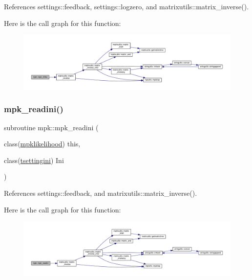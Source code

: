 References settings\+::feedback, settings\+::logzero, and matrixutils\+::matrix\+\_\+inverse().

Here is the call graph for this function\+:
\nopagebreak
\begin{figure}[H]
\begin{center}
\leavevmode
\includegraphics[width=350pt]{namespacempk_a881489521c6dfae2df332a70f188e9db_cgraph}
\end{center}
\end{figure}
\mbox{\label{namespacempk_ac8174e4d3727a0be4651a6e3c23a413b}} 
\subsubsection{\texorpdfstring{mpk\+\_\+readini()}{mpk\_readini()}}
{\footnotesize\ttfamily subroutine mpk\+::mpk\+\_\+readini (\begin{DoxyParamCaption}\item[{class(\mbox{\hyperlink{structmpk_1_1mpklikelihood}{mpklikelihood}})}]{this,  }\item[{class(\mbox{\hyperlink{structsettings_1_1tsettingini}{tsettingini}})}]{Ini }\end{DoxyParamCaption})}



References settings\+::feedback, and matrixutils\+::matrix\+\_\+inverse().

Here is the call graph for this function\+:
\nopagebreak
\begin{figure}[H]
\begin{center}
\leavevmode
\includegraphics[width=350pt]{namespacempk_ac8174e4d3727a0be4651a6e3c23a413b_cgraph}
\end{center}
\end{figure}
\mbox{\label{namespacempk_ae7cb8b283f9de4deefe99581fac85c0a}} 
